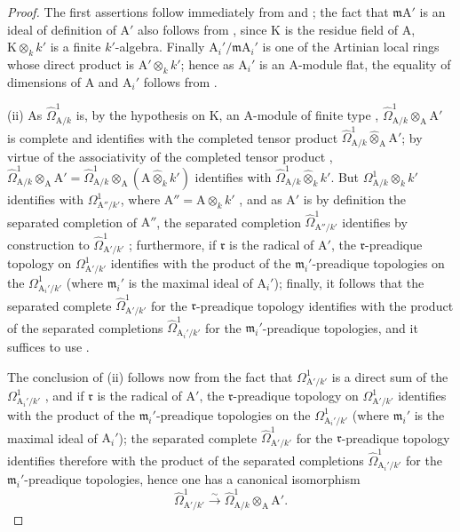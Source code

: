 \begin{proof}
The first assertions follow immediately from  and ; the fact that $\mathfrak{m}\mathrm{A}'$ is an ideal of definition of $\mathrm{A}'$ also follows from , since $\mathrm{K}$ is the residue field of $\mathrm{A}$, $\mathrm{K}\otimes_k k'$ is a finite $k'$-algebra.
Finally $\mathrm{A}_i'/\mathfrak{m}\mathrm{A}_i'$ is one of the Artinian local rings whose direct product is $\mathrm{A}'\otimes_k k'$; hence as $\mathrm{A}_i'$ is an $\mathrm{A}$-module flat, the equality of dimensions of $\mathrm{A}$ and $\mathrm{A}_i'$ follows from .

(ii) As $\hat{\Omega}^1_{\mathrm{A}/k}$ is, by the hypothesis on $\mathrm{K}$, an $\mathrm{A}$-module of finite type , $\hat{\Omega}^1_{\mathrm{A}/k}\otimes_{\mathrm{A}}\mathrm{A}'$ is complete and identifies with the completed tensor product $\hat{\Omega}^1_{\mathrm{A}/k}\widehat{\otimes}_{\mathrm{A}}\mathrm{A}'$; by virtue of the associativity of the completed tensor product , $\hat{\Omega}^1_{\mathrm{A}/k}\otimes_{\mathrm{A}}\mathrm{A}'=\hat{\Omega}^1_{\mathrm{A}/k}\otimes_{\mathrm{A}}(\mathrm{A}\widehat{\otimes}_kk')$ identifies with $\hat{\Omega}^1_{\mathrm{A}/k}\widehat{\otimes}_kk'$.
But $\Omega^1_{\mathrm{A}/k}\otimes_kk'$ identifies with $\Omega^1_{\mathrm{A}''/k'}$, where $\mathrm{A}''=\mathrm{A}\otimes_kk'$ , and as $\mathrm{A}'$ is by definition the separated completion of $\mathrm{A}''$, the separated completion $\hat{\Omega}^1_{\mathrm{A}''/k'}$ identifies by construction to $\hat{\Omega}^1_{\mathrm{A}'/k'}$ ; furthermore, if $\mathfrak{r}$ is the radical of $\mathrm{A}'$, the $\mathfrak{r}$-preadique topology on $\Omega^1_{\mathrm{A}'/k'}$ identifies with the product of the $\mathfrak{m}_i'$-preadique topologies on the $\Omega^1_{\mathrm{A}_i'/k'}$ (where $\mathfrak{m}_i'$ is the maximal ideal of $\mathrm{A}_i'$); finally, it follows that the separated complete $\hat{\Omega}^1_{\mathrm{A}'/k'}$ for the $\mathfrak{r}$-preadique topology identifies with the product of the separated completions $\hat{\Omega}^1_{\mathrm{A}_i'/k'}$ for the $\mathfrak{m}_i'$-preadique topologies, and it suffices to use .

The conclusion of (ii) follows now from the fact that $\Omega^1_{\mathrm{A}'/k'}$ is a direct sum of the $\Omega^1_{\mathrm{A}_i'/k'}$ , and if $\mathfrak{r}$ is the radical of $\mathrm{A}'$, the $\mathfrak{r}$-preadique topology on $\Omega^1_{\mathrm{A}'/k'}$ identifies with the product of the $\mathfrak{m}_i'$-preadique topologies on the $\Omega^1_{\mathrm{A}_i'/k'}$ (where $\mathfrak{m}_i'$ is the maximal ideal of $\mathrm{A}_i'$); the separated complete $\hat{\Omega}^1_{\mathrm{A}'/k'}$ for the $\mathfrak{r}$-preadique topology identifies therefore with the product of the separated completions $\hat{\Omega}^1_{\mathrm{A}_i'/k'}$ for the $\mathfrak{m}_i'$-preadique topologies, hence one has a canonical isomorphism
\[
  \hat{\Omega}^1_{\mathrm{A}'/k'}\xrightarrow{\sim}\hat{\Omega}^1_{\mathrm{A}/k}\otimes_{\mathrm{A}}\mathrm{A}'.
\]
\end{proof}

